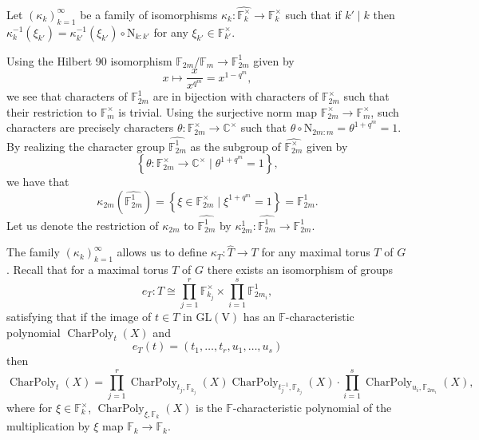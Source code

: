 \documentclass[12pt, reqno]{amsart}
\theoremstyle{definition}
\theoremstyle{definition}
\theoremstyle{definition}
\newcommand{\cComplex}{\mathbb{C}}
\newcommand{\multiplicativegroup}[1]{#1^{\times}}
\newcommand{\hermitianSpace}{\mathrm{V}}
\newcommand{\GL}{\mathrm{GL}}
\newcommand{\FieldNorm}[2]{\mathrm{N}_{#1:#2}}
\newcommand{\finiteField}{\mathbb{F}}
\newcommand{\finiteFieldExtension}[1]{\finiteField_{#1}}
\newcommand{\charactergroup}[1]{\widehat{\multiplicativegroup{\finiteFieldExtension{#1}}}}
\newcommand{\ToriDualToriIsomorphism}{\kappa}
\newcommand{\characteristicPolynomial}{\operatorname{CharPoly}}
\begin{document}
Let $\left(\ToriDualToriIsomorphism_k\right)_{k=1}^{\infty}$ be a family of isomorphisms $\ToriDualToriIsomorphism_k \colon \charactergroup{k} \to \multiplicativegroup{\finiteFieldExtension{k}}$ such that if $k' \mid k$ then $\ToriDualToriIsomorphism_k^{-1}\left(\xi_{k'}\right) = \ToriDualToriIsomorphism_{k'}^{-1}\left(\xi_{k'}\right) \circ \FieldNorm{k}{k'}$ for any $\xi_{k'} \in \multiplicativegroup{\finiteFieldExtension{k'}}$.

Using the Hilbert 90 isomorphism $\finiteFieldExtension{2m} \slash \finiteFieldExtension{m} \to \finiteFieldExtension{2m}^{1}$ given by $$x \mapsto \frac{x}{x^{q^m}} = x^{1 - q^m},$$ we see that characters of $\finiteFieldExtension{2m}^1$ are in bijection with characters of $\multiplicativegroup{\finiteFieldExtension{2m}}$ such that their restriction to $\multiplicativegroup{\finiteFieldExtension{m}}$ is trivial. Using the surjective norm map $\multiplicativegroup{\finiteFieldExtension{2m}} \to \multiplicativegroup{\finiteFieldExtension{m}}$, such characters are precisely characters $\theta \colon \multiplicativegroup{\finiteFieldExtension{2m}} \to \multiplicativegroup{\cComplex}$ such that $\theta \circ \FieldNorm{2m}{m} = \theta^{1 + q^m} = 1$. By realizing the character group $\widehat{\finiteFieldExtension{2m}^1}$ as the subgroup of $\charactergroup{2m}$ given by $$\left\{ \theta \colon \multiplicativegroup{\finiteFieldExtension{2m}} \to \multiplicativegroup{\cComplex} \mid \theta^{1+q^m} = 1\right\},$$
we have that $$\ToriDualToriIsomorphism_{2m}\left(\widehat{\finiteFieldExtension{2m}^1}\right) = \left\{\xi \in \multiplicativegroup{\finiteFieldExtension{2m}} \mid \xi^{1+q^m} = 1\right\} = \finiteFieldExtension{2m}^1.$$
Let us denote the restriction of $\ToriDualToriIsomorphism_{2m}$ to $\widehat{\finiteFieldExtension{2m}^1}$ by $\ToriDualToriIsomorphism_{2m}^1 \colon \widehat{\finiteFieldExtension{2m}^1} \to \finiteFieldExtension{2m}^1$.

The family $\left(\ToriDualToriIsomorphism_k\right)_{k=1}^{\infty}$ allows us to define $\ToriDualToriIsomorphism_T \colon \widehat{T} \to T$ for any maximal torus $T$ of $G$. Recall that for a maximal torus $T$ of $G$ there exists an isomorphism of groups $$e_T \colon T \cong \prod_{j=1}^r \multiplicativegroup{\finiteFieldExtension{k_j}} \times \prod_{i=1}^s \finiteFieldExtension{2m_i}^1,$$
satisfying that if the image of $t \in T$ in $\GL\left(\hermitianSpace\right)$ has an $\finiteField$-characteristic polynomial $\characteristicPolynomial_{t}\left(X\right)$ and $$e_T\left(t\right) = \left(t_1,\dots,t_r,u_1,\dots,u_s\right)$$ then $$\characteristicPolynomial_{t}\left(X\right) = \prod_{j=1}^r \characteristicPolynomial_{t_j, \finiteFieldExtension{k_j}}\left(X\right) \characteristicPolynomial_{t_j^{-1}, \finiteFieldExtension{k_j}}\left(X\right) \cdot \prod_{i=1}^s \characteristicPolynomial_{u_i, \finiteFieldExtension{2 m_i}}\left(X\right),$$
where for $\xi \in \multiplicativegroup{\finiteFieldExtension{k}}$, $\characteristicPolynomial_{\xi, \finiteFieldExtension{k}}\left(X\right)$ is the $\finiteField$-characteristic polynomial of the multiplication by $\xi$ map $\finiteFieldExtension{k} \to \finiteFieldExtension{k}$.
\end{document}
